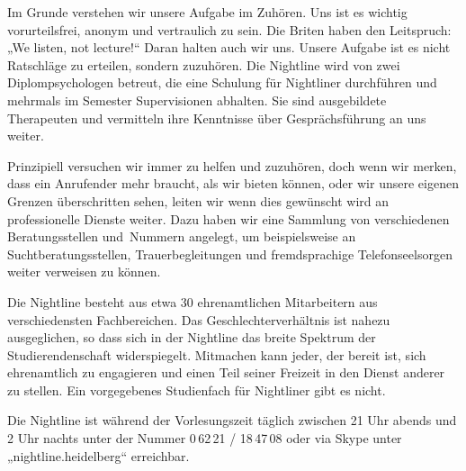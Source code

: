 Im Grunde verstehen wir unsere Aufgabe im Zuhören. Uns ist es wichtig vorurteilsfrei, anonym und vertraulich zu sein. Die Briten haben den Leitspruch: „We listen, not lecture!“ Daran halten auch wir uns. Unsere Aufgabe ist es nicht Ratschläge zu erteilen, sondern zuzuhören. Die Nightline wird von zwei Diplompsychologen betreut, die eine Schulung für Nightliner durchführen und mehrmals im Semester Supervisionen abhalten. Sie sind ausgebildete Therapeuten und vermitteln ihre Kenntnisse über Gesprächsführung an uns weiter.

Prinzipiell versuchen wir immer zu helfen und zuzuhören, doch wenn wir merken, dass ein Anrufender mehr braucht, als wir bieten können, oder wir unsere eigenen Grenzen überschritten sehen, leiten wir wenn dies gewünscht wird an professionelle Dienste weiter. Dazu haben wir eine Sammlung von verschiedenen Beratungsstellen und~Nummern angelegt, um beispielsweise an Suchtberatungsstellen, Trauerbegleitungen und fremdsprachige Telefonseelsorgen weiter verweisen zu können.

Die Nightline besteht aus etwa 30 ehrenamtlichen Mitarbeitern aus verschiedensten Fachbereichen. Das Geschlechterverhältnis ist nahezu ausgeglichen, so dass sich in der Nightline das breite Spektrum der Studierendenschaft widerspiegelt. Mitmachen kann jeder, der bereit ist, sich ehrenamtlich zu engagieren und einen Teil seiner Freizeit in den Dienst anderer zu stellen. Ein vorgegebenes Studienfach für Nightliner gibt es nicht.

Die Nightline ist während der Vorlesungszeit täglich zwischen 21 Uhr abends und 2 Uhr nachts unter der Nummer 0\,62\,21 / 18\,47\,08 oder via Skype unter „nightline.heidelberg“ erreichbar.
